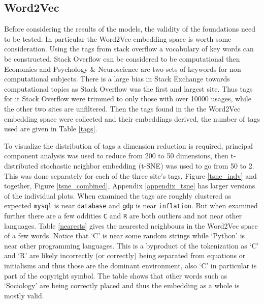 \documentclass[12pt, a4paper]{article}
\begin{document}
\subsection{Word2Vec}

Before considering the results of the models, the validity of the foundations need to be tested. In particular the Word2Vec embedding space is worth some consideration. Using the tags from stack overflow a vocabulary of key words can be constructed. Stack Overflow can be considered to be computational then Economics and Psychology \& Neuroscience are two sets of keywords for non-computational subjects. There is a large bias in Stack Exchange towards computational topics as Stack Overflow was the first and largest site. Thus tags for it Stack Overflow were trimmed to only those with over \num{10000} usages, while the other two sites are unfiltered. Then the tags found in the the Word2Vec embedding space were collected and their embeddings derived, the number of tags used are given in Table \ref{tags}. 

To visualize the distribution of tags a dimension reduction is required, principal component analysis was used to reduce from 200 to 50 dimensions, then t-distributed stochastic neighbor embedding (t-SNE) \citep{maaten2008visualizing} was used to go from 50 to 2. This was done separately for each of the three site's tags, Figure \ref{tsne_indv} and together, Figure \ref{tsne_combined}, Appendix \ref{appendix_tsne} has larger versions of the individual plots. When examined the tags are roughly clustered as expected \texttt{mysql} is near \texttt{database} and \texttt{gdp} is near \texttt{inflation}. But when examined further there are a few oddities \texttt{C} and \texttt{R} are both outliers and not near other languages. Table \ref{nearests} gives the nearested neighbours in the Word2Vec space of a few words. Notice that `C' is near some random strings while `Python' is near other programming languages. This is a byproduct of the tokenization as `C' and `R' are likely incorrectly (or correctly) being separated from equations or initialisms and thus those are the dominant environment, also `C' in particular is part of the copyright symbol. The table shows that other words such as `Sociology' are being correctly placed and thus the embedding as a whole is mostly valid.
\end{document}

